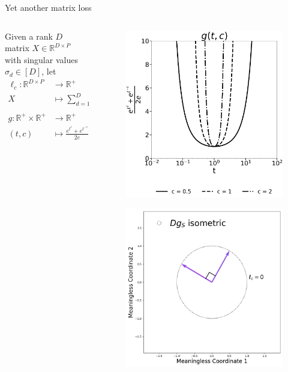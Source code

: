 \begin{frame}{Yet another matrix loss}
\small
\begin{columns}
\begin{column}{0.5\textwidth}
Given a rank $D$ matrix $X \in \mathbb{R}^{D \times P}$ with singular values $\sigma_d \in [D]$, let
\begin{align*}
\ell_{c}: \mathbb{R}^{D \times P} &\to \mathbb{R}^+ \\
X &\mapsto \sum_{d=1}^D g(\sigma_d(X), c) - D\\
\\[-1ex]
g: \mathbb{R}^+ \times \mathbb{R}^+ &\to \mathbb{R}^+ \\
(t, c) &\mapsto \frac{e^{t^c} + e^{t^{-c}}}{2e}.
\end{align*}
\vspace{-.5cm}
\end{column}
\begin{column}{0.5\textwidth}
\begin{figure}[h!]
    \centering
    \includegraphics[width=.6\linewidth]{../figures/Figure_1a_ct} %
\end{figure}
\begin{figure}[h!]
    \centering
    \includegraphics[width=.6\linewidth]{../figures/isometree} %
\end{figure}
\end{column}
\end{columns}
\end{frame}




